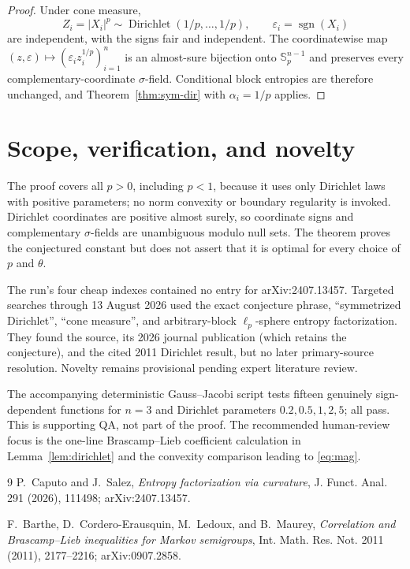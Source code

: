 \documentclass[11pt,a4paper]{article}
\newcommand{\eps}{\varepsilon}
\begin{document}
\begin{proof}
Under cone measure,
\[
 Z_i=|X_i|^p\sim\operatorname{Dirichlet}(1/p,\ldots,1/p),
 \qquad \eps_i=\operatorname{sgn}(X_i)
\]
are independent, with the signs fair and independent.  The coordinatewise
map $(z,\eps)\mapsto(\eps_i z_i^{1/p})_{i=1}^n$ is an almost-sure bijection
onto $\mathbb S_p^{n-1}$ and preserves every complementary-coordinate
$\sigma$-field.  Conditional block entropies are therefore unchanged, and
Theorem~\ref{thm:sym-dir} with $\alpha_i=1/p$ applies.
\end{proof}

\section*{Scope, verification, and novelty}
The proof covers all $p>0$, including $p<1$, because it uses only Dirichlet
laws with positive parameters; no norm convexity or boundary regularity is
invoked.  Dirichlet coordinates are positive almost surely, so coordinate
signs and complementary $\sigma$-fields are unambiguous modulo null sets.
The theorem proves the conjectured constant but does not assert that it is
optimal for every choice of $p$ and $\theta$.

The run's four cheap indexes contained no entry for arXiv:2407.13457.
Targeted searches through 13 August 2026 used the exact conjecture phrase,
``symmetrized Dirichlet'', ``cone measure'', and arbitrary-block
$\ell_p$-sphere entropy factorization.  They found the source, its 2026
journal publication (which retains the conjecture), and the cited 2011
Dirichlet result, but no later primary-source resolution.  Novelty remains
provisional pending expert literature review.

The accompanying deterministic Gauss--Jacobi script tests fifteen genuinely
sign-dependent functions for $n=3$ and Dirichlet parameters
$0.2,0.5,1,2,5$; all pass.  This is supporting QA, not part of the proof.
The recommended human-review focus is the one-line Brascamp--Lieb coefficient
calculation in Lemma~\ref{lem:dirichlet} and the convexity comparison leading
to \eqref{eq:mag}.

\begin{thebibliography}{9}
P.~Caputo and J.~Salez,
\emph{Entropy factorization via curvature},
J. Funct. Anal. 291 (2026), 111498; arXiv:2407.13457.

F.~Barthe, D.~Cordero-Erausquin, M.~Ledoux, and B.~Maurey,
\emph{Correlation and Brascamp--Lieb inequalities for Markov semigroups},
Int. Math. Res. Not. 2011 (2011), 2177--2216; arXiv:0907.2858.
\end{thebibliography}
\end{document}
